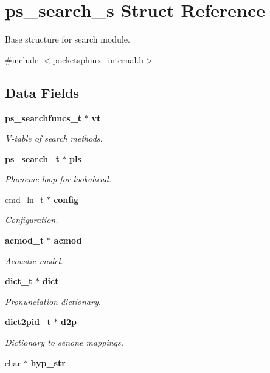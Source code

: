 \section{ps\-\_\-search\-\_\-s Struct Reference}
\label{structps__search__s}


Base structure for search module.  




{\ttfamily \#include $<$pocketsphinx\-\_\-internal.\-h$>$}

\subsection*{Data Fields}
\begin{DoxyCompactItemize}
\item 
{\bf ps\-\_\-searchfuncs\-\_\-t} $\ast$ {\bf vt}
\begin{DoxyCompactList}\small\item\em V-\/table of search methods. \end{DoxyCompactList}\item 
{\bf ps\-\_\-search\-\_\-t} $\ast$ {\bf pls}
\begin{DoxyCompactList}\small\item\em Phoneme loop for lookahead. \end{DoxyCompactList}\item 
cmd\-\_\-ln\-\_\-t $\ast$ {\bf config}
\begin{DoxyCompactList}\small\item\em Configuration. \end{DoxyCompactList}\item 
{\bf acmod\-\_\-t} $\ast$ {\bf acmod}
\begin{DoxyCompactList}\small\item\em Acoustic model. \end{DoxyCompactList}\item 
{\bf dict\-\_\-t} $\ast$ {\bf dict}
\begin{DoxyCompactList}\small\item\em Pronunciation dictionary. \end{DoxyCompactList}\item 
{\bf dict2pid\-\_\-t} $\ast$ {\bf d2p}
\begin{DoxyCompactList}\small\item\em Dictionary to senone mappings. \end{DoxyCompactList}\item 
char $\ast$ {\bf hyp\-\_\-str}

\end{DoxyCompactItemize}
